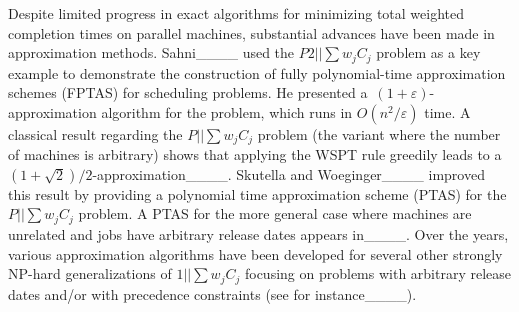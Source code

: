 




Despite limited progress in exact algorithms for minimizing total weighted completion times on parallel machines, substantial advances have been made in approximation methods. Sahni____ used the $P2||\sum w_jC_j$ problem as a key example to demonstrate the construction of fully polynomial-time approximation schemes (FPTAS) for scheduling problems. He presented a~$(1+\varepsilon)$-approximation algorithm for the problem, which runs in $O(n^2/\varepsilon)$ time. A classical result regarding the $P||\sum w_j C_j$ problem (the variant where the number of machines is arbitrary) shows that applying the WSPT rule greedily leads to a $(1+\sqrt{2})/2$-approximation____. Skutella and Woeginger____ improved this result by providing a polynomial time approximation scheme (PTAS) for the $P||\sum w_j C_j$ problem. A PTAS for the more general case where
machines are unrelated and jobs have arbitrary release dates appears in____. Over the years, various approximation algorithms have been developed for several other strongly NP-hard generalizations of $1||\sum w_j C_j$ focusing on problems with arbitrary release dates and/or with precedence constraints (see for instance____). 

